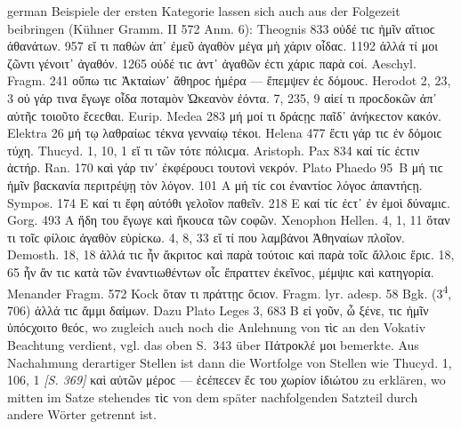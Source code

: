 \begin{otherlanguage*}{german}
Beispiele der ersten Kategorie lassen sich auch aus der Folgezeit beibringen (Kühner Gramm. II 572 Anm. 6): Theognis 833 οὐδέ τιϲ ἡμῖν αἴτιοϲ ἀθανάτων. 957 εἴ τι παθὼν ἀπ᾽ ἐμεῦ ἀγαθὸν μέγα μὴ χάριν οἶδαϲ. 1192 ἀλλά τί μοι ζῶντι γένοιτ᾽ ἀγαθόν. 1265 οὐδέ τιϲ ἀντ᾽ ἀγαθῶν ἐϲτι χάριϲ παρὰ ϲοί. Aeschyl. Fragm. 241 οὔπω τιϲ Ἀκταίων᾽ ἄθηροϲ ἡμέρα — ἔπεμψεν ἐϲ δόμουϲ. Herodot 2, 23, 3 οὐ γάρ τινα ἔγωγε οἶδα ποταμὸν Ὠκεανὸν ἐόντα. 7, 235, 9 αἰεί τι προϲδοκῶν ἀπ᾽ αὐτῆϲ τοιοῦτο ἔϲεϲθαι. Eurip. Medea 283 μή μοί τι δράϲῃϲ παῖδ᾽ ἀνήκεϲτον κακόν. Elektra 26 μή τῳ λαθραίωϲ τέκνα γενναίῳ τέκοι. Helena 477 ἔϲτι γάρ τιϲ ἐν δόμοιϲ τύχη. Thucyd. 1, 10, 1 εἴ τι τῶν τότε πόλιϲμα. Aristoph. Pax 834 καί τίϲ ἐϲτιν ἀϲτήρ. Ran. 170 καὶ γάρ τιν᾽ ἐκφέρουϲι τουτονὶ νεκρόν. Plato Phaedo 95~Β μή τιϲ ἡμῖν βαϲκανία περιτρέψῃ τὸν λόγον. 101 Α μή τίϲ ϲοι ἐναντίοϲ λόγοϲ ἀπαντήϲῃ. Sympos. 174 Ε καί τι ἔφη αὐτόθι γελοῖον παθεῖν. 218 Ε καί τίϲ ἐϲτ᾽ ἐν ἐμοὶ δύναμιϲ. Gorg. 493 Α ἤδη του ἔγωγε καὶ ἤκουϲα τῶν ϲοφῶν. Xenophon Hellen. 4, 1, 11 ὅταν τι τοῖϲ φίλοιϲ ἀγαθὸν εὑρίϲκω. 4, 8, 33 εἴ τί που λαμβάνοι Ἀθηναίων πλοῖον. Demosth. 18, 18 ἀλλά τιϲ ἦν ἄκριτοϲ καὶ παρὰ τούτοιϲ καὶ παρὰ τοῖϲ ἄλλοιϲ ἔριϲ. 18, 65 ἦν ἄν τιϲ κατὰ τῶν ἐναντιωθέντων οἷϲ ἔπραττεν ἐκεῖνοϲ, μέμψιϲ καὶ κατηγορία. Menander Fragm. 572 Kock ὅταν τι πράττῃϲ ὅϲιον. Fragm. lyr. adesp. 58 Bgk. (3\textsuperscript{4}, 706) ἀλλά τιϲ ἄμμι δαίμων. Dazu Plato Leges 3, 683 Β εἰ γοῦν, ὦ ξένε, τιϲ ἡμῖν ὑπόϲχοιτο θεόϲ, wo zugleich auch noch die Anlehnung von τὶϲ an den Vokativ Beachtung verdient, vgl. das oben S.~343 über Πάτροκλέ μοι bemerkte. Aus Nachahmung derartiger Stellen ist dann die Wortfolge von Stellen wie Thucyd. 1, 106, 1 \hypertarget{p369}{\emph{[S. 369]}}\label{p369} καὶ αὐτῶν μέροϲ — ἐϲέπεϲεν ἔϲ του χωρίον ἰδιώτου zu erklären, wo mitten im Satze stehendes τὶϲ von dem später nachfolgenden Satzteil durch andere Wörter getrennt ist.


\end{otherlanguage*}
